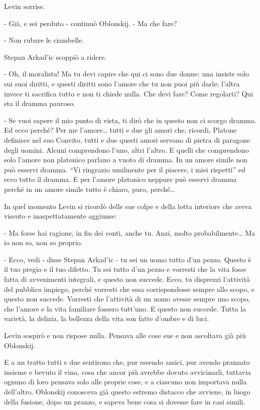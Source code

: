 Levin sorrise. 

- Già, e sei perduto - continuò Oblonskij. - Ma che fare? 

- Non rubare le ciambelle. 

Stepan Arkad'ic scoppiò a ridere. 

- Oh, il moralista! Ma tu devi capire che qui ci sono due donne: una insiste solo sui suoi diritti, e questi diritti sono l'amore che tu non puoi più darle; l'altra invece ti sacrifica tutto e non ti chiede nulla. Che devi fare? Come regolarti? Qui sta il dramma pauroso. 

- Se vuoi sapere il mio punto di vista, ti dirò che in questo non ci scorgo dramma. Ed ecco perché? Per me l'amore\ldots{} tutti e due gli amori che, ricordi, Platone definisce nel suo Convito, tutti e due questi amori servono di pietra di paragone degli uomini. Alcuni comprendono l'uno, altri l'altro. E quelli che comprendono solo l'amore non platonico parlano a vuoto di dramma. In un amore simile non può esservi dramma. ``Vi ringrazio umilmente per il piacere, i miei rispetti'' ed ecco tutto il dramma. E per l'amore platonico neppure può esservi dramma perché in un amore simile tutto è chiaro, puro, perché\ldots{} 

In quel momento Levin si ricordò delle sue colpe e della lotta interiore che aveva vissuto e inaspettatamente aggiunse: 

- Ma forse hai ragione, in fin dei conti, anche tu. Anzi, molto probabilmente\ldots{} Ma io non so, non so proprio. 

- Ecco, vedi - disse Stepan Arkad'ic - tu sei un uomo tutto d'un pezzo. Questo è il tuo pregio e il tuo difetto. Tu sei tutto d'un pezzo e vorresti che la vita fosse fatta di avvenimenti integrali, e questo non succede. Ecco, tu disprezzi l'attività del pubblico impiego, perché vorresti che essa corrispondesse sempre allo scopo, e questo non succede. Vorresti che l'attività di un uomo avesse sempre uno scopo, che l'amore e la vita familiare fossero tutt'uno. E questo non succede. Tutta la varietà, la delizia, la bellezza della vita son fatte d'ombre e di luci. 

Levin sospirò e non rispose nulla. Pensava alle cose sue e non ascoltava già più Oblonskij. 

E a un tratto tutti e due sentirono che, pur essendo amici, pur avendo pranzato insieme e bevuto il vino, cosa che ancor più avrebbe dovuto avvicinarli, tuttavia ognuno di loro pensava solo alle proprie cose, e a ciascuno non importava nulla dell'altro. Oblonskij conosceva già questo estremo distacco che avviene, in luogo della fusione, dopo un pranzo, e sapeva bene cosa si dovesse fare in casi simili. 


